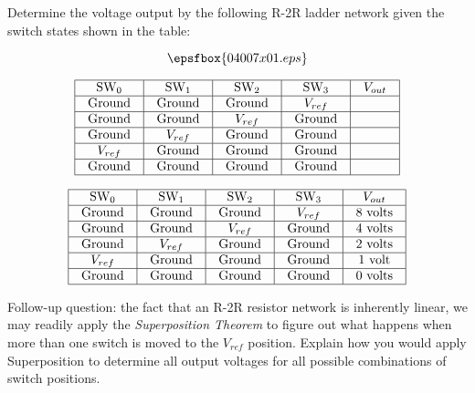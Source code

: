 

Determine the voltage output by the following R-2R ladder network given the switch states shown in the table:

$$\epsfbox{04007x01.eps}$$


$$\vbox{\offinterlineskip
\halign{\strut
\vrule \quad\hfil # \ \hfil & 
\vrule \quad\hfil # \ \hfil & 
\vrule \quad\hfil # \ \hfil & 
\vrule \quad\hfil # \ \hfil & 
\vrule \quad\hfil # \ \hfil \vrule \cr
\noalign{\hrule}
%
SW$_{0}$ & SW$_{1}$ & SW$_{2}$ & SW$_{3}$ & $V_{out}$ \cr
%
\noalign{\hrule}
%
Ground & Ground & Ground & $V_{ref}$ &  \cr
%
\noalign{\hrule}
%
Ground & Ground & $V_{ref}$ & Ground & \cr
%
\noalign{\hrule}
%
Ground & $V_{ref}$ & Ground & Ground &  \cr
% 
\noalign{\hrule}
%
$V_{ref}$ & Ground & Ground & Ground &  \cr
% 
\noalign{\hrule}
%
Ground & Ground & Ground & Ground &  \cr
%
\noalign{\hrule}
} %
}$$ %







$$\vbox{\offinterlineskip
\halign{\strut
\vrule \quad\hfil # \ \hfil & 
\vrule \quad\hfil # \ \hfil & 
\vrule \quad\hfil # \ \hfil & 
\vrule \quad\hfil # \ \hfil & 
\vrule \quad\hfil # \ \hfil \vrule \cr
\noalign{\hrule}
%
SW$_{0}$ & SW$_{1}$ & SW$_{2}$ & SW$_{3}$ & $V_{out}$ \cr
%
\noalign{\hrule}
%
Ground & Ground & Ground & $V_{ref}$ & 8 volts \cr
%
\noalign{\hrule}
%
Ground & Ground & $V_{ref}$ & Ground & 4 volts \cr
%
\noalign{\hrule}
%
Ground & $V_{ref}$ & Ground & Ground & 2 volts \cr
% 
\noalign{\hrule}
%
$V_{ref}$ & Ground & Ground & Ground & 1 volt \cr
% 
\noalign{\hrule}
%
Ground & Ground & Ground & Ground & 0 volts \cr
%
\noalign{\hrule}
} %
}$$ %

\vskip 10pt

Follow-up question: the fact that an R-2R resistor network is inherently linear, we may readily apply the {\it Superposition Theorem} to figure out what happens when more than one switch is moved to the $V_{ref}$ position.  Explain how you would apply Superposition to determine all output voltages for all possible combinations of switch positions.

